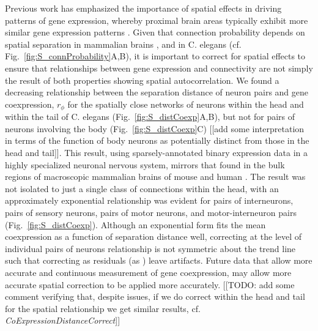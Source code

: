 \documentclass[10pt,letterpaper]{article}
\begin{document}
Previous work has emphasized the importance of spatial effects in driving patterns of gene expression, whereby proximal brain areas typically exhibit more similar gene expression patterns \citep{Pantazatos:2016ir, Krienen2016, Fulcher:2016ck}.
Given that connection probability depends on spatial separation in mammalian brains \cite{Henderson:2014fg, Horvat:2016ia, Wang:2016gg}, and in C. elegans (cf. Fig.~\ref{fig:S_connProbability}A,B), it is important to correct for spatial effects to ensure that relationships between gene expression and connectivity are not simply the result of both properties showing spatial autocorrelation.
We found a decreasing relationship between the separation distance of neuron pairs and gene coexpression, $r_\phi$ for the spatially close networks of neurons within the head and within the tail of C. elegans (Fig.~\ref{fig:S_distCoexp}A,B), but not for pairs of neurons involving the body (Fig.~\ref{fig:S_distCoexp}C) [[add some interpretation in terms of the function of body neurons as potentially distinct from those in the head and tail]].
This result, using sparsely-annotated binary expression data in a highly specialized neuronal nervous system, mirrors that found in the bulk regions of macroscopic mammalian brains of mouse \cite{Fulcher:2016ck} and human \cite{Krienen:2016eq}.
The result was not isolated to just a single class of connections within the head, with an approximately exponential relationship was evident for pairs of interneurons, pairs of sensory neurons, pairs of motor neurons, and motor-interneuron pairs (Fig.~\ref{fig:S_distCoexp}).
Although an exponential form fits the mean coexpression as a function of separation distance well, correcting at the level of individual pairs of neurons relationship is not symmetric about the trend line such that correcting as residuals (as \citet{Fulcher:2016ck}) leave artifacts.
Future data that allow more accurate and continuous measurement of gene coexpression, may allow more accurate spatial correction to be applied more accurately.
[[TODO: add some comment verifying that, despite issues, if we do correct within the head and tail for the spatial relationship we get similar results, cf. \emph{CoExpressionDistanceCorrect}]]
\end{document}
